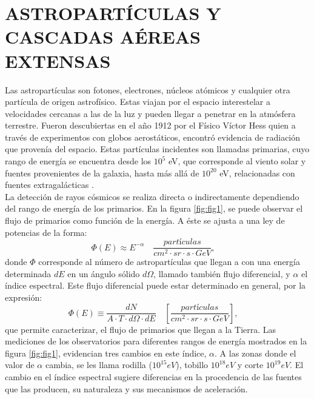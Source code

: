 \newpage
\chapter{ASTROPARTÍCULAS Y CASCADAS AÉREAS EXTENSAS}

Las astropartículas son fotones, electrones, núcleos atómicos y cualquier otra partícula de origen astrofísico. Estas viajan por el espacio interestelar a velocidades cercanas a las de la luz y pueden llegar a penetrar en la atmósfera terrestre. Fueron descubiertas en el año 1912 por el Físico Víctor Hess quien a través de experimentos con globos aerostáticos, encontró evidencia de radiación que provenía del espacio. Estas partículas incidentes son llamadas primarias, cuyo rango de energía se encuentra desde los $10^5$ eV, que corresponde al  viento solar y fuentes provenientes de la galaxia, hasta m\'as all\'a de $10^{20}$ eV, relacionadas con fuentes extragalácticas \cite{augerextra}. \\

La detección de rayos cósmicos se realiza directa o indirectamente dependiendo del rango de energía de los primarios. En la figura \ref{fig:fig1}, se puede observar el flujo de primarios como función de la energía. A éste se ajusta a una ley de potencias de la forma:%
\begin{equation}
\Phi(E) \approx E^{-\alpha}\quad \frac{partículas}{cm^{2} \cdot sr \cdot s \cdot GeV}, \quad
\label{eq:eq1}
\end{equation}
donde $\Phi$ corresponde al número de astropartículas que llegan a con una energía determinada $dE$ en un ángulo sólido $d\Omega$, llamado también flujo diferencial, y $\alpha$ el índice espectral. Este flujo diferencial puede estar determinado en general, por la expresión:
\begin{equation}
    \Phi (E) \equiv \frac{dN}{A \cdot T \cdot d\Omega \cdot dE} \quad \left[\frac{partículas}{cm^{2} \cdot sr \cdot s \cdot GeV} \right], \quad
\end{equation}
que permite caracterizar, el flujo de primarios que llegan a la Tierra. Las mediciones de los observatorios para diferentes rangos de energía mostrados en la figura \ref{fig:fig1}, evidencian tres cambios en este índice, $\alpha$. A las zonas donde el valor de $\alpha$ cambia, se les llama rodilla ($10^{15}eV$), tobillo $10^{18}eV$ y corte $10^{19}eV$.  \cite{PDG} El cambio en el índice espectral sugiere diferencias en la procedencia de las fuentes que las producen, su naturaleza y sus mecanismos de aceleración.\\

